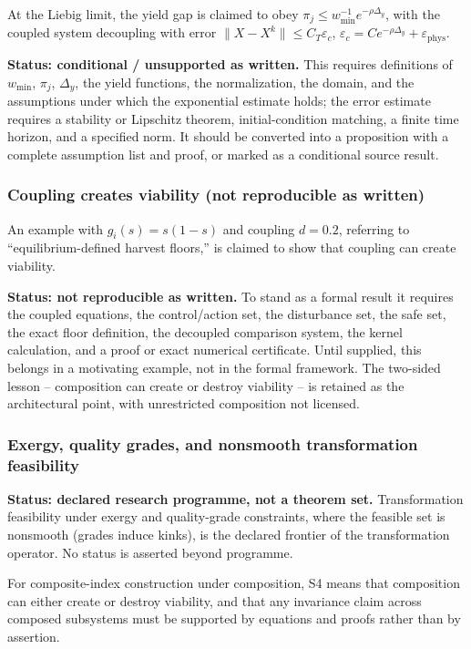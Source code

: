 At the Liebig limit, the yield gap is claimed to obey $\pi_j \le w_{\min}^{-1} e^{-\rho \Delta_y}$, with the coupled system decoupling with error $\|X - X^k\| \le C_T \varepsilon_c$, $\varepsilon_c = C e^{-\rho \Delta_y} + \varepsilon_{\mathrm{phys}}$.

\textbf{Status: conditional / unsupported as written.} This requires definitions of $w_{\min}$, $\pi_j$, $\Delta_y$, the yield functions, the normalization, the domain, and the assumptions under which the exponential estimate holds; the error estimate requires a stability or Lipschitz theorem, initial-condition matching, a finite time horizon, and a specified norm. It should be converted into a proposition with a complete assumption list and proof, or marked as a conditional source result.


\subsubsection{Coupling creates viability (not reproducible as written)}

An example with $g_i(s) = s(1-s)$ and coupling $d = 0.2$, referring to ``equilibrium-defined harvest floors,'' is claimed to show that coupling can create viability.

\textbf{Status: not reproducible as written.} To stand as a formal result it requires the coupled equations, the control/action set, the disturbance set, the safe set, the exact floor definition, the decoupled comparison system, the kernel calculation, and a proof or exact numerical certificate. Until supplied, this belongs in a motivating example, not in the formal framework. The two-sided lesson -- composition can create or destroy viability -- is retained as the architectural point, with unrestricted composition not licensed.


\subsubsection{Exergy, quality grades, and nonsmooth transformation feasibility}

\textbf{Status: declared research programme, not a theorem set.} Transformation feasibility under exergy and quality-grade constraints, where the feasible set is nonsmooth (grades induce kinks), is the declared frontier of the transformation operator. No status is asserted beyond programme.

For composite-index construction under composition, S4 means that composition can either create or destroy viability, and that any invariance claim across composed subsystems must be supported by equations and proofs rather than by assertion.



